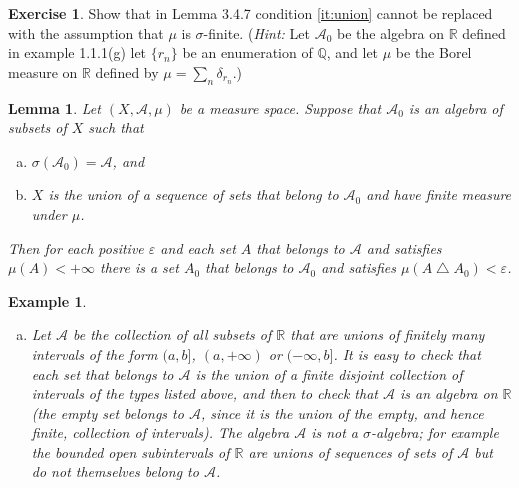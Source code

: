 \documentclass[11pt,a4paper,twoside]{article}
\theoremstyle{definition}
\newcounter{excounter}
\newtheorem{exercise}[excounter]{Exercise}
\theoremstyle{plain}
\newtheorem{lemma}{Lemma}[subsection]
\newtheorem{example}{Example}[subsection]
\begin{document}
\begin{exercise}

  Show that in Lemma 3.4.7 condition \ref{it:union} cannot be replaced with the assumption that
  $\mu$ is $\sigma$-finite. (\emph{Hint:} Let $\mathscr{A}_0$ be the algebra on $\mathbb{R}$
  defined in example 1.1.1(g) let $\{ r_n \}$ be an enumeration of $\mathbb{Q}$, and let $\mu$
  be the Borel measure on $\mathbb{R}$ defined by $\mu = \sum_n \delta_{r_n}$.)

\end{exercise}

\bigskip
\begin{lemma}

  Let $(X, \mathscr{A}, \mu)$ be a measure space. Suppose that $\mathscr{A}_0$ is an algebra of
  subsets of $X$ such that
  \begin{enumerate}[(a)]

  \item $\sigma ( \mathscr{A}_0 ) = \mathscr{A}$, and

  \item \label{it:union} $X$ is the union of a sequence of sets that belong to $\mathscr{A}_0$ and have finite measure under $\mu$.

  \end{enumerate}
  Then for each positive $\varepsilon$ and each set $A$ that belongs to $\mathscr{A}$ and satisfies $\mu ( A ) < +\infty$
  there is a set $A_0$ that belongs to $\mathscr{A}_0$ and satisfies $\mu ( A \bigtriangleup A_0 ) < \varepsilon$.

\end{lemma}

\setcounter{section}{1}
\setcounter{subsection}{1}
\setcounter{example}{0}

\bigskip
\begin{example}

\begin{enumerate}[(g)]

\item Let $\mathscr{A}$ be the collection of all subsets of $\mathbb{R}$ that are unions of finitely many intervals
  of the form $( a, b ]$, $( a, +\infty )$ or $( -\infty, b ]$. It is easy to check that each set that belongs to $\mathscr{A}$
  is the union of a finite disjoint collection of intervals of the types listed above, and then to check that $\mathscr{A}$
  is an algebra on $\mathbb{R}$ (the empty set belongs to $\mathscr{A}$, since it is the union of the empty, and hence finite,
  collection of intervals). The algebra $\mathscr{A}$ is not a $\sigma$-algebra; for example the bounded open subintervals of $\mathbb{R}$
  are unions of sequences of sets of $\mathscr{A}$ but do not themselves belong to $\mathscr{A}$.

\end{enumerate}

\end{example}
\end{document}
